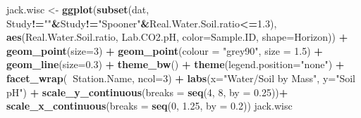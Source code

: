 \documentclass[]{article}
\newenvironment{Shaded}{\begin{snugshade}}{\end{snugshade}}
\newcommand{\DataTypeTok}[1]{\textcolor[rgb]{0.13,0.29,0.53}{#1}}
\newcommand{\DecValTok}[1]{\textcolor[rgb]{0.00,0.00,0.81}{#1}}
\newcommand{\FloatTok}[1]{\textcolor[rgb]{0.00,0.00,0.81}{#1}}
\newcommand{\KeywordTok}[1]{\textcolor[rgb]{0.13,0.29,0.53}{\textbf{#1}}}
\newcommand{\NormalTok}[1]{#1}
\newcommand{\OperatorTok}[1]{\textcolor[rgb]{0.81,0.36,0.00}{\textbf{#1}}}
\newcommand{\StringTok}[1]{\textcolor[rgb]{0.31,0.60,0.02}{#1}}
\begin{document}
\begin{Shaded}
\begin{Highlighting}[]
\NormalTok{jack.wisc <-}\StringTok{ }\KeywordTok{ggplot}\NormalTok{(}\KeywordTok{subset}\NormalTok{(dat, Study}\OperatorTok{!=}\StringTok{""}\OperatorTok{&}\NormalTok{Study}\OperatorTok{!=}\StringTok{"Spooner"}\OperatorTok{&}\NormalTok{Real.Water.Soil.ratio}\OperatorTok{<=}\FloatTok{1.3}\NormalTok{), }\KeywordTok{aes}\NormalTok{(Real.Water.Soil.ratio, Lab.CO2.pH, }\DataTypeTok{color=}\NormalTok{Sample.ID, }\DataTypeTok{shape=}\NormalTok{Horizon)) }\OperatorTok{+}\StringTok{ }
\StringTok{  }\KeywordTok{geom_point}\NormalTok{(}\DataTypeTok{size=}\DecValTok{3}\NormalTok{) }\OperatorTok{+}\StringTok{ }\KeywordTok{geom_point}\NormalTok{(}\DataTypeTok{colour =} \StringTok{"grey90"}\NormalTok{, }\DataTypeTok{size =} \FloatTok{1.5}\NormalTok{) }\OperatorTok{+}\StringTok{ }\KeywordTok{geom_line}\NormalTok{(}\DataTypeTok{size=}\FloatTok{0.3}\NormalTok{) }\OperatorTok{+}\StringTok{ }\KeywordTok{theme_bw}\NormalTok{() }\OperatorTok{+}\StringTok{ }\KeywordTok{theme}\NormalTok{(}\DataTypeTok{legend.position=}\StringTok{"none"}\NormalTok{) }\OperatorTok{+}
\StringTok{  }\KeywordTok{facet_wrap}\NormalTok{(}\OperatorTok{~}\NormalTok{Station.Name, }\DataTypeTok{ncol=}\DecValTok{3}\NormalTok{) }\OperatorTok{+}\StringTok{ }\KeywordTok{labs}\NormalTok{(}\DataTypeTok{x=}\StringTok{"Water/Soil by Mass"}\NormalTok{, }\DataTypeTok{y=}\StringTok{"Soil pH"}\NormalTok{) }\OperatorTok{+}\StringTok{ }
\StringTok{  }\KeywordTok{scale_y_continuous}\NormalTok{(}\DataTypeTok{breaks =} \KeywordTok{seq}\NormalTok{(}\DecValTok{4}\NormalTok{, }\DecValTok{8}\NormalTok{, }\DataTypeTok{by =} \FloatTok{0.25}\NormalTok{))}\OperatorTok{+}
\StringTok{  }\KeywordTok{scale_x_continuous}\NormalTok{(}\DataTypeTok{breaks =} \KeywordTok{seq}\NormalTok{(}\DecValTok{0}\NormalTok{, }\FloatTok{1.25}\NormalTok{, }\DataTypeTok{by =} \FloatTok{0.2}\NormalTok{))}
\NormalTok{jack.wisc}
\end{Highlighting}
\end{Shaded}
\end{document}
